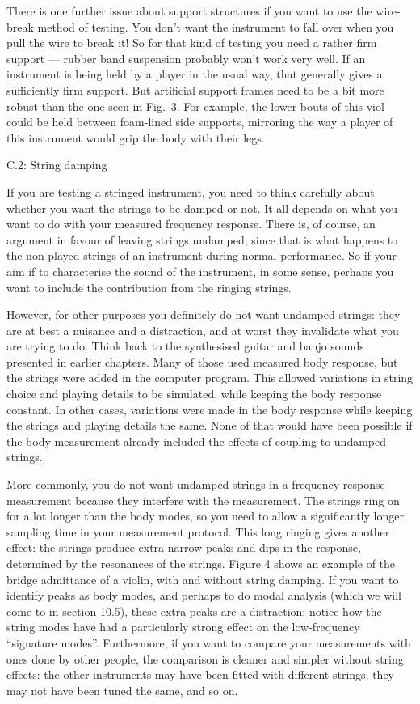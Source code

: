   There is one further issue about support structures if you want to use the 
  wire-break method of testing. You don't want the instrument to fall over when 
  you pull the wire to break it! So for that kind of testing you need a rather 
  firm support --- rubber band suspension probably won't work very well. If an 
  instrument is being held by a player in the usual way, that generally gives a 
  sufficiently firm support. But artificial support frames need to be a bit 
  more robust than the one seen in Fig.\ 3. For example, the lower bouts of 
  this viol could be held between foam-lined side supports, mirroring the way a 
  player of this instrument would grip the body with their legs. 

  C.2: String damping 

  If you are testing a stringed instrument, you need to think carefully about 
  whether you want the strings to be damped or not. It all depends on what you 
  want to do with your measured frequency response. There is, of course, an 
  argument in favour of leaving strings undamped, since that is what happens to 
  the non-played strings of an instrument during normal performance. So if your 
  aim if to characterise the sound of the instrument, in some sense, perhaps 
  you want to include the contribution from the ringing strings. 

  However, for other purposes you definitely do not want undamped strings: they 
  are at best a nuisance and a distraction, and at worst they invalidate what 
  you are trying to do. Think back to the synthesised guitar and banjo sounds 
  presented in earlier chapters. Many of those used measured body response, but 
  the strings were added in the computer program. This allowed variations in 
  string choice and playing details to be simulated, while keeping the body 
  response constant. In other cases, variations were made in the body response 
  while keeping the strings and playing details the same. None of that would 
  have been possible if the body measurement already included the effects of 
  coupling to undamped strings. 

  More commonly, you do not want undamped strings in a frequency response 
  measurement because they interfere with the measurement. The strings ring on 
  for a lot longer than the body modes, so you need to allow a significantly 
  longer sampling time in your measurement protocol. This long ringing gives 
  another effect: the strings produce extra narrow peaks and dips in the 
  response, determined by the resonances of the strings. Figure 4 shows an 
  example of the bridge admittance of a violin, with and without string 
  damping. If you want to identify peaks as body modes, and perhaps to do modal 
  analysis (which we will come to in section 10.5), these extra peaks are a 
  distraction: notice how the string modes have had a particularly strong 
  effect on the low-frequency ``signature modes''. Furthermore, if you want to 
  compare your measurements with ones done by other people, the comparison is 
  cleaner and simpler without string effects: the other instruments may have 
  been fitted with different strings, they may not have been tuned the same, 
  and so on. 


